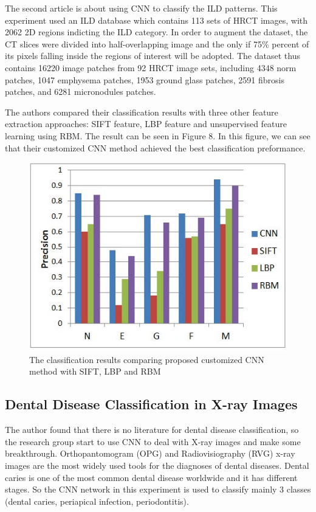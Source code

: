 \documentclass[10pt,twocolumn,letterpaper]{article}
\begin{document}
The second article\cite{li2014medical} is about using CNN to classify the ILD patterns. This experiment used an ILD database which contains 113 sets of HRCT images, with 2062 2D regions indicting the ILD category. In order to augment the dataset, the CT slices were divided into half-overlapping image and the only if 75\% percent of its pixels falling inside the regions of interest will be adopted. The dataset thus contains 16220 image patches from 92 HRCT image sets,
including 4348 norm patches, 1047 emphysema patches, 1953 ground glass patches, 2591 fibrosis patches, and 6281 micronodules patches.

The authors compared their classification results with three other feature extraction approaches: SIFT feature, LBP feature and unsupervised feature learning using RBM. The result can be seen in Figure 8. In this figure, we can see that their customized CNN method achieved the best classification preformance.

\begin{figure}[t]
	\begin{center}
		\includegraphics[width=0.8\linewidth]{Pic/11.jpg}
	\end{center}
	\caption{The classification results comparing proposed customized CNN method with SIFT, LBP and RBM}
	\label{fig:long}
	\label{fig:onecol}
\end{figure}

\subsection{Dental Disease Classification in X-ray Images}

The author found that there is no literature for dental disease classification, so the research group start to use CNN to deal with X-ray images and make some breakthrough. Orthopantomogram (OPG) and Radiovisiography (RVG) x-ray images are the most widely used tools for the diagnoses of dental diseases. Dental caries is one of the most common dental disease worldwide and it has different stages. So the CNN network in this experiment is used to classify mainly 3 classes (dental caries, periapical infection, periodontitis)\cite{prajapaticlassification}.
\end{document}
